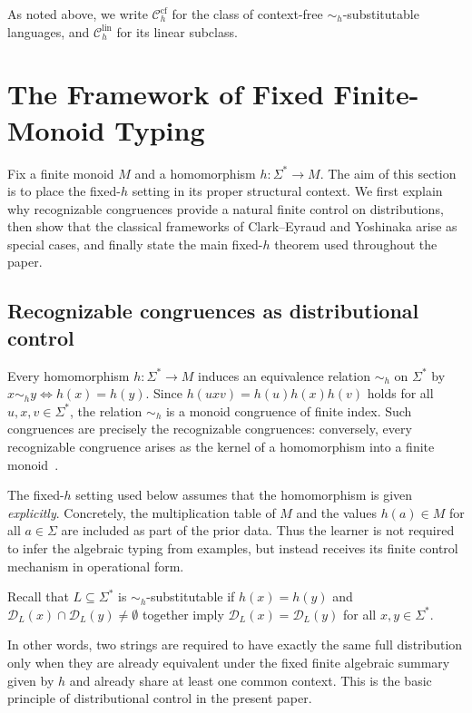 \documentclass[11pt,a4paper]{article}
\newcommand{\D}{\mathcal{D}}
\newcommand{\cf}{\mathrm{cf}}
\newcommand{\lin}{\mathrm{lin}}
\newcommand{\Ccf}[1]{\mathcal C_{#1}^{\cf}}
\newcommand{\Clin}[1]{\mathcal C_{#1}^{\lin}}
\begin{document}
As noted above, we write $\Ccf{h}$ for the class of context-free
$\sim_h$-substitutable languages, and $\Clin{h}$ for its linear
subclass.

\section{The Framework of Fixed Finite-Monoid Typing}
\label{sec:framework}

Fix a finite monoid $M$ and a homomorphism $h:\Sigma^*\to M$. The aim
of this section is to place the fixed-$h$ setting in its proper
structural context. We first explain why recognizable congruences
provide a natural finite control on distributions, then show that the
classical frameworks of Clark--Eyraud and Yoshinaka arise as special
cases, and finally state the main fixed-$h$ theorem used throughout the
paper.

\subsection{Recognizable congruences as distributional control}
\label{subsec:recognizable-control}

Every homomorphism $h:\Sigma^*\to M$ induces an equivalence relation
$\sim_h$ on $\Sigma^*$ by $x\sim_h y \iff h(x)=h(y)$. Since
$h(uxv)=h(u)h(x)h(v)$ holds for all $u,x,v\in\Sigma^*$, the relation
$\sim_h$ is a monoid congruence of finite index. Such congruences are
precisely the recognizable congruences: conversely, every recognizable
congruence arises as the kernel of a homomorphism into a finite
monoid~\cite{eilenberg1974}.

The fixed-$h$ setting used below assumes that the homomorphism is given
\emph{explicitly}. Concretely, the multiplication table of $M$ and the
values $h(a)\in M$ for all $a\in\Sigma$ are included as part of the
prior data. Thus the learner is not required to infer the algebraic
typing from examples, but instead receives its finite control mechanism
in operational form.

Recall that $L\subseteq\Sigma^*$ is $\sim_h$-substitutable if
$h(x)=h(y)$ and $\D_L(x)\cap\D_L(y)\neq\emptyset$ together imply
$\D_L(x)=\D_L(y)$ for all $x,y\in\Sigma^*$.

In other words, two strings are required to have exactly the same full
distribution only when they are already equivalent under the fixed
finite algebraic summary given by $h$ and already share at least one
common context. This is the basic principle of distributional control in
the present paper.
\end{document}
